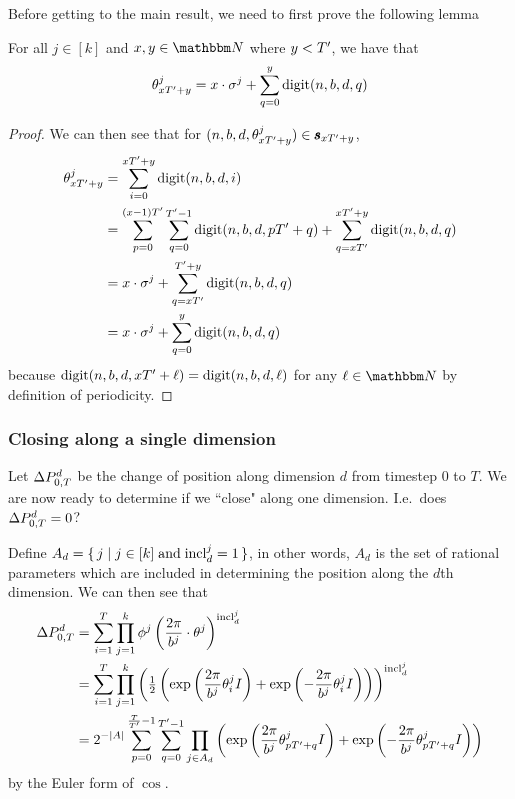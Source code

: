 Before getting to the main result, we need to first prove the following lemma
\begin{lemma}{For all $j \in [k]$ and $x, y \in \N$ where $y < {T}'$, we have that 
  $$
    \theta_{xT' + y}^j = x\cdot \sigma^j + \sum_{q = 0}^y \mathrm{digit}(n, b, d, q)
  $$}
  \label{lemma:angleBreakdown}
  \begin{proof}
    We can then see that for $(n, b, d, \theta_{x{T}' + y}^j) \in \pmb{s}_{x{T}' + y}$,
    \begin{align*}
      {\theta^j_{x {T}'+ y}} &= \sum_{i = 0}^{x {T}' + y} \mathrm{digit}(n, b, d, i) \\
      &= \sum_{p = 0}^{(x- 1){T}'} \sum_{q=0}^{{T}' - 1} \mathrm{digit}(n, b, d, p{T}' + q)
          + \sum_{q = x {T}'}^{x {T}' + y} \mathrm{digit}(n, b, d, q)\\
      &= x \cdot \sigma^j + \sum_{q = x {T}'}^{{T}' + y}\mathrm{digit}(n, b, d, q)\\
      &= x \cdot \sigma^j + \sum_{q = 0}^{y}\mathrm{digit}(n, b, d, q)
    \end{align*}
    because $\mathrm{digit}(n, b, d, x{T}' + \ell) = \mathrm{digit}(n, b, d, \ell)$ for any $\ell \in \N$
    by definition of periodicity.
  \end{proof}
\end{lemma}

\subsubsection{Closing along a single dimension}
Let $\Delta P_{0, T}^d$ be the change of position along dimension $d$
from timestep 0 to $T$.
We are now ready to determine if we ``close" along one dimension. I.e.\ does
$
\Delta P_{0, T}^d = 0
$?

Define $A_d = \set{j \mid j \in [k] \; \text{and}\; {\mathrm{incl}_{d}^{j}} = 1}$, in other words,
$A_d$ is the set of rational parameters which are included in determining the position along the $d$th dimension.
We can then see that
\begin{align*}
\Delta P_{0, T}^d &=\sum_{i = 1}^T \prod_{j=1}^k \phi^j\left(\frac{2\pi}{b^j} \cdot \theta^j\right) ^ {{\mathrm{incl}_{d}^{j}}}\\
  &=\sum_{i = 1}^T \prod_{j = 1}^k \left(\tfrac{1}{2} \left(\exp\left({\frac{2\pi}{b^j} {\theta^j_{i}} I}\right) +  \exp\left(-\frac{2\pi}{b^j} {\theta^j_{i}} I\right)\right)\right)^{\mathrm{incl}_{d}^{j}}\\
  &= 2^{-|A|} \sum_{p= 0}^{\frac{T}{{T}'} - 1} \sum_{q = 0}^{{T}' - 1}
    \prod_{j \in A_d} \left(
      \exp\left(\frac{2\pi}{b^j}{\theta^j_{p {T}' + q}} I\right) +  \exp\left(-\frac{2\pi}{b^j}{\theta^j_{p {T}' + q}} I\right)\right)
\end{align*}
by the Euler form of $\cos$.

